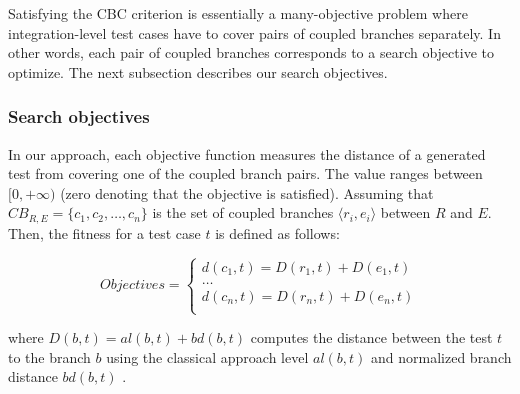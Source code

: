 Satisfying the CBC criterion is essentially a many-objective problem where integration-level test cases have to cover pairs of coupled branches separately. In other words, each pair of coupled branches corresponds to a search objective to optimize. The next subsection describes our search objectives.

\subsubsection{Search objectives}
In our approach, each objective function measures the distance of a generated test from covering one of the coupled branch pairs. The value ranges between $[0,+\infty)$ (zero denoting that the objective is satisfied).
Assuming that $CB_{R,E} = \{c_1, c_2, \ldots, c_n \}$ is the set of coupled branches $\langle r_i, e_i \rangle$ between $R$ and $E$. Then, the fitness for a test case $t$ is defined as follows: 

%


\begin{equation}\label{eq:fitness_functions}
    Objectives = \left\{
    \begin{array}{lcr}
        d(c_1,t) = D(r_1,t) + D(e_1,t)\\
        \dots\\
        d(c_n,t) = D(r_n,t) + D(e_n,t)\\
    \end{array}
    \right.
\end{equation}

\noindent where $D(b,t) = al(b,t) + bd(b,t) $ computes the distance between the test $t$ to the branch $b$ using the classical approach level $al(b,t)$ and normalized branch distance $bd(b,t)$ \cite{McMinn2004}.

